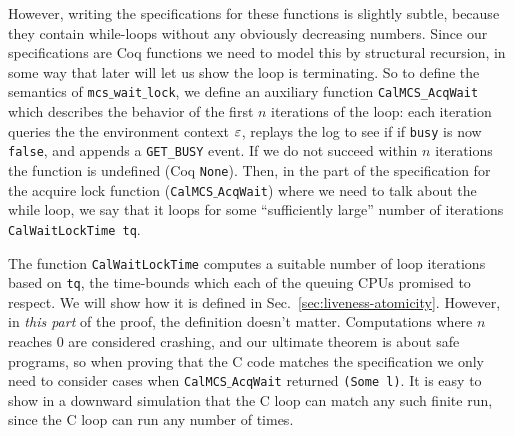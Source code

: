 However, writing the specifications for these functions is slightly subtle, 
because they contain
while-loops without any obviously decreasing numbers. Since our
specifications are Coq functions we need to model this by structural
recursion, in some way that later will let us show the loop is terminating.
So to define the semantics of \texttt{mcs$\_$wait$\_$lock},
we define an auxiliary function
\lstinline$CalMCS_AcqWait$ which describes the
behavior of the first $n$ iterations of the loop: each iteration
queries the the environment context $\oracle$, replays the log to see if if \lstinline$busy$ is now \lstinline$false$, and appends a \texttt{GET\_BUSY} event.
If we do not succeed within $n$ iterations the function is undefined (Coq \texttt{None}).
Then, in the part of the  specification for the  acquire lock 
function (\texttt{CalMCS$\_$AcqWait}) where we need to talk about the while loop,
we say that it loops for some ``sufficiently large'' 
number of iterations \lstinline$CalWaitLockTime tq$. 

The function \lstinline$CalWaitLockTime$ computes a suitable 
number of loop iterations based on \lstinline$tq$, the time-bounds  which each of the queuing CPUs promised to respect.
We will show how it is defined in Sec.~\ref{sec:liveness-atomicity}. 
However, in \emph{this part} of the proof, the definition doesn't matter. 
Computations where $n$ reaches 0 are considered crashing, and our
ultimate theorem is about safe programs, so when proving that the C
code matches the specification we only need to 
consider cases when \texttt{CalMCS$\_$AcqWait} returned \texttt{(Some l)}.
It is easy to show in a downward simulation that the C loop can match any such finite run, 
since the C loop can run any number of times.
%
%
%
%
